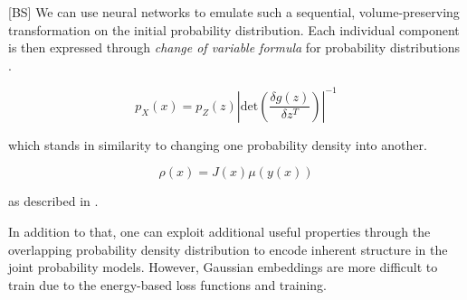 \documentclass{NSF}
\begin{document}
[BS]
We can use neural networks to emulate such a sequential, volume-preserving transformation on the initial probability distribution.
Each individual component is then expressed through \textit{change of variable formula} for probability distributions \cite{nvp}.

\begin{equation}
    p_X(x) = p_Z(z) | \text{det} \left( \frac{ \delta g(z) }{ \delta z^T} \right) |^{-1}
\end{equation}

which stands in similarity to changing one probability density into another.

\begin{equation}
    \rho(x) = J(x) \mu( y(x) )
\end{equation}

as described in \cite{normalising_flows_classification_clustering}.

In addition to that, one can exploit additional useful properties through the overlapping probability density distribution to encode inherent structure in the joint probability models.
However, Gaussian embeddings are more difficult to train due to the energy-based loss functions and training.
\end{document}
